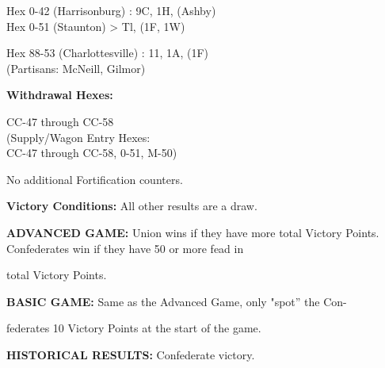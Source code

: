 \begin{scenariodata}
Hex 0-42 (Harrisonburg) : 9C, 1H, (Ashby)\\
Hex 0-51 (Staunton) > Tl, (1F, 1W)\\
\end{scenariodata}

\begin{scenariodata}
Hex 88-53 (Charlottesville) : 11, 1A, (1F)\\
(Partisans: McNeill, Gilmor)\\
\end{scenariodata}

\begin{scenariodata}
\textbf{Withdrawal Hexes:}\\
\end{scenariodata}

\begin{scenariodata}
CC-47 through CC-58\\
(Supply/Wagon Entry Hexes:\\
CC-47 through CC-58, 0-51, M-50)\\
\end{scenariodata}

\begin{scenariodata}
No additional Fortification counters.\\
\end{scenariodata}

\begin{scenariodata}
\textbf{Victory Conditions:} All other results are a draw.\\
\end{scenariodata}

\begin{scenariodata}
\textbf{ADVANCED GAME:} Union wins if they have more total Victory Points.\\
Confederates win if they have 50 or more fead in\\
\end{scenariodata}

total Victory Points.

\begin{scenariodata}
\textbf{BASIC GAME:} Same as the Advanced Game, only "spot'' the Con-\\
\end{scenariodata}

federates 10 Victory Points at the start of the game.

\begin{scenariodata}
\textbf{HISTORICAL RESULTS:} Confederate victory.\\
\end{scenariodata}

